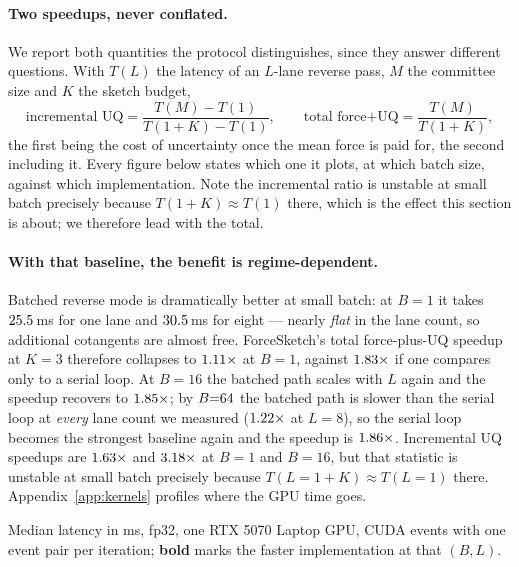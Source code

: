 \documentclass{article}
\begin{document}
\paragraph{Two speedups, never conflated.}
We report both quantities the protocol distinguishes, since they answer different questions. With
$T(L)$ the latency of an $L$-lane reverse pass, $M$ the committee size and $K$ the sketch budget,
\begin{equation}
\text{incremental UQ}=\frac{T(M)-T(1)}{T(1{+}K)-T(1)},
\qquad
\text{total force+UQ}=\frac{T(M)}{T(1{+}K)} ,
\end{equation}
the first being the cost of uncertainty once the mean force is paid for, the second including it.
Every figure below states which one it plots, at which batch size, against which implementation.
Note the incremental ratio is unstable at small batch precisely because $T(1{+}K)\approx T(1)$ there,
which is the effect this section is about; we therefore lead with the total.

\paragraph{With that baseline, the benefit is regime-dependent.}
Batched reverse mode is dramatically better at small batch: at $B{=}1$ it takes
$25.5$\,ms for one lane and $30.5$\,ms for eight --- nearly
\emph{flat} in the lane count, so additional cotangents are almost free. ForceSketch's total
force-plus-UQ speedup at $K{=}3$ therefore collapses to $1.11\times$ at $B{=}1$,
against $1.83\times$ if one compares only to a serial loop. At $B{=}16$ the batched path scales with
$L$ again and the speedup recovers to $1.85\times$; by
$B{=}64{}$ the batched path is slower than the serial loop at \emph{every} lane
count we measured ($1.22\times$ at $L{=}8$), so the serial loop becomes the strongest
baseline again and the speedup is $1.86\times$. Incremental UQ speedups
are $1.63\times$ and $3.18\times$ at $B{=}1$ and $B{=}16$,
but that statistic is unstable at small batch precisely because $T(L{=}1{+}K)\approx T(L{=}1)$ there. Appendix~\ref{app:kernels} profiles where the GPU time goes.

\begin{center}\small

\end{center}
\vspace{-0.4em}
{\small Median latency in ms, fp32, one RTX 5070 Laptop GPU, CUDA events with one event pair
per iteration; \textbf{bold} marks the faster implementation at that $(B,L)$.}
\end{document}

